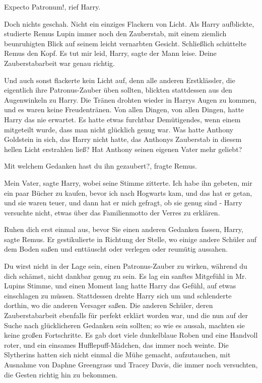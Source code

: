 \glqq{}Expecto Patronum!\grqq{}, rief Harry.

Doch nichts geschah. Nicht ein einziges Flackern von Licht. Als Harry
aufblickte, studierte Remus Lupin immer noch den Zauberstab, mit einem ziemlich
beunruhigten Blick auf seinem leicht vernarbten Gesicht. Schließlich schüttelte
Remus den Kopf. \glqq{}Es tut mir leid, Harry\grqq{}, sagte der Mann leise. \glqq{}
Deine Zauberstabarbeit war genau richtig.\grqq{}

Und auch sonst flackerte kein Licht auf, denn alle anderen Erstklässler, die
eigentlich ihre Patronus-Zauber üben sollten, blickten stattdessen aus den
Augenwinkeln zu Harry. Die Tränen drohten wieder in Harrys Augen zu kommen, und
es waren keine Freudentränen. Von allen Dingen, von allen Dingen, hatte Harry
das nie erwartet. Es hatte etwas furchtbar Demütigendes, wenn einem mitgeteilt
wurde, dass man nicht glücklich genug war. Was hatte Anthony Goldstein in sich,
das Harry nicht hatte, das Anthonys Zauberstab in diesem hellen Licht erstrahlen
ließ? Hat Anthony seinen eigenen Vater mehr geliebt?

\glqq{}Mit welchem Gedanken hast du ihn gezaubert?\grqq{}, fragte Remus.

\glqq{}Mein Vater\grqq{}, sagte Harry, wobei seine Stimme zitterte. \glqq{}Ich
habe ihn gebeten, mir ein paar Bücher zu kaufen, bevor ich nach Hogwarts kam,
und das hat er getan, und sie waren teuer, und dann hat er mich gefragt, ob sie
genug sind -\grqq{} Harry versuchte nicht, etwas über das Familienmotto der Verres zu
erklären.

\glqq{}Ruhen dich erst einmal aus, bevor Sie einen anderen Gedanken fassen,
Harry\grqq{}, sagte Remus. Er gestikulierte in Richtung der Stelle, wo einige
andere Schüler auf dem Boden saßen und enttäuscht oder verlegen oder reumütig
aussahen.

\glqq{}Du wirst nicht in der Lage sein, einen Patronus-Zauber zu wirken, während
du dich schämst, nicht dankbar genug zu sein.\grqq{} Es lag ein sanftes
Mitgefühl in Mr. Lupins Stimme, und einen Moment lang hatte Harry das Gefühl,
auf etwas einschlagen zu müssen. Stattdessen drehte Harry sich um und
schlenderte dorthin, wo die anderen Versager saßen. Die anderen Schüler, deren
Zauberstabarbeit ebenfalls für perfekt erklärt worden war, und die nun auf der
Suche nach glücklicheren Gedanken sein sollten; so wie es aussah, machten sie
keine großen Fortschritte. Es gab dort viele dunkelblaue Roben und eine Handvoll
roter, und ein einsames Hufflepuff-Mädchen, das immer noch weinte. Die
Slytherins hatten sich nicht einmal die Mühe gemacht, aufzutauchen, mit Ausnahme
von Daphne Greengrass und Tracey Davis, die immer noch versuchten, die Gesten
richtig hin zu bekommen.

